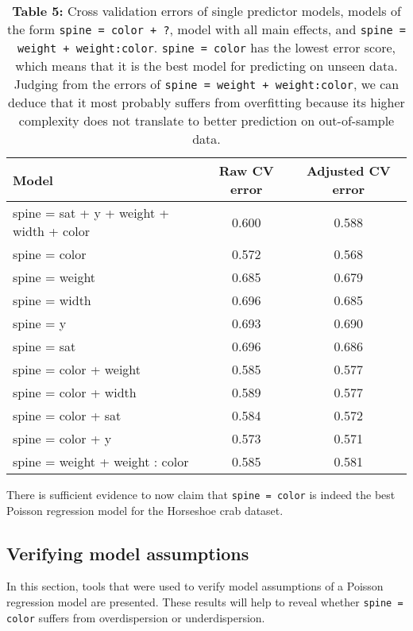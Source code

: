 \documentclass[a4paper, 12pt]{article}
\begin{document}
\begin{table}[htbp]
  \centering
    \begin{tabular}{|p{14.78em}|c|c|}
    \toprule
    Model & \multicolumn{1}{p{7.61em}|}{Raw CV error} & \multicolumn{1}{p{10.335em}|}{Adjusted CV error } \\
    \midrule
    spine = sat + y + weight + width + color  & 0.600 & 0.588 \\
    \rowcolor[rgb]{ 1,  .949,  .8} spine = color  & 0.572 & 0.568 \\
    spine = weight  & 0.685 & 0.679 \\
    spine = width  & 0.696 & 0.685 \\
    spine = y & 0.693 & 0.690 \\
    spine = sat  & 0.696 & 0.686 \\
    spine = color + weight & 0.585 & 0.577 \\
    spine = color + width & 0.589 & 0.577 \\
    spine = color + sat  & 0.584 & 0.572 \\
    spine = color + y  & 0.573 & 0.571 \\
    spine = weight + weight : color & 0.585 & 0.581 \\
    \bottomrule
    \end{tabular}%
    \caption*{\textbf{Table 5:} Cross validation errors of single predictor models, models of the form \texttt{spine = color + ?}, model with all main effects, and \texttt{spine = weight + weight:color}. \texttt{spine = color} has the lowest error score, which means that it is the best model for predicting on unseen data. Judging from the errors of \texttt{spine = weight + weight:color}, we can deduce that it most probably suffers from overfitting because its higher complexity does not translate to better prediction on out-of-sample data.}
\end{table}%

\indent There is sufficient evidence to now claim that \texttt{spine = color} is indeed the best Poisson regression model for the Horseshoe crab dataset.

\subsection{Verifying model assumptions}
In this section, tools that were used to verify model assumptions of a Poisson regression model are presented. These results will help to reveal whether \texttt{spine = color} suffers from overdispersion or underdispersion.
\end{document}
